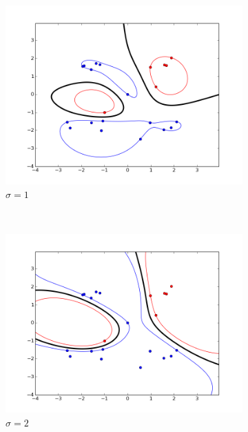 \documentclass{article}
\begin{document}
\begin{figure}[!h]
    \centering
    \begin{subfigure}[b]{0.3\textwidth}
        \includegraphics[width=1.2\textwidth]{images/rbf/3/figure_1.png}
        \caption{$\sigma = 1$} \label{rbf_3_figure_1}
    \end{subfigure}
    ~ 
    \begin{subfigure}[b]{0.3\textwidth}
        \includegraphics[width=1.2\textwidth]{images/rbf/3/figure_2.png}
        \caption{$\sigma = 2$}  \label{rbf_3_figure_2}
    \end{subfigure}
     ~ 
    \begin{subfigure}[b]{0.3\textwidth}

\end{subfigure}
\end{figure}
\end{document}
